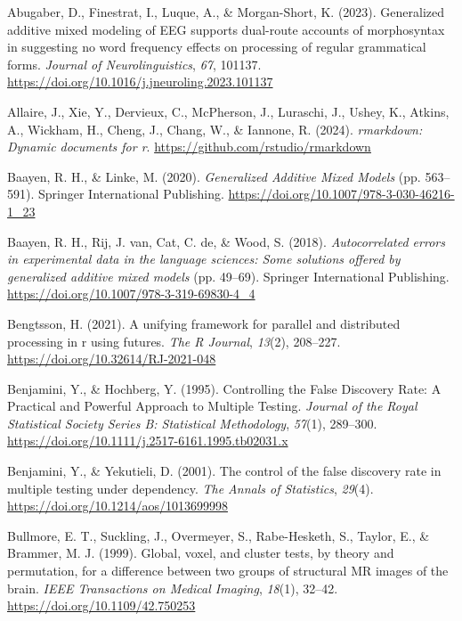 \documentclass[
  doc,
  floatsintext,
  longtable,
  a4paper,
  nolmodern,
  notxfonts,
  notimes,
  colorlinks=true,linkcolor=blue,citecolor=blue,urlcolor=blue]{apa7}
\newlength{\cslhangindent}
\newenvironment{CSLReferences}[2] %
 {\begin{list}{}{%
  \setlength{\itemindent}{0pt}
  \setlength{\leftmargin}{0pt}
  \setlength{\parsep}{0pt}
  \ifodd #1
   \setlength{\leftmargin}{\cslhangindent}
   \setlength{\itemindent}{-1\cslhangindent}
  \fi
  \setlength{\itemsep}{#2\baselineskip}}}
 {\end{list}}
\begin{document}
\label{refs}
\begin{CSLReferences}{1}{0}
Abugaber, D., Finestrat, I., Luque, A., \& Morgan-Short, K. (2023).
Generalized additive mixed modeling of EEG supports dual-route accounts
of morphosyntax in suggesting no word frequency effects on processing of
regular grammatical forms. \emph{Journal of Neurolinguistics},
\emph{67}, 101137.
\url{https://doi.org/10.1016/j.jneuroling.2023.101137}

Allaire, J., Xie, Y., Dervieux, C., McPherson, J., Luraschi, J., Ushey,
K., Atkins, A., Wickham, H., Cheng, J., Chang, W., \& Iannone, R.
(2024). \emph{{rmarkdown}: Dynamic documents for r}.
\url{https://github.com/rstudio/rmarkdown}

Baayen, R. H., \& Linke, M. (2020). \emph{Generalized Additive Mixed
Models} (pp. 563--591). Springer International Publishing.
\url{https://doi.org/10.1007/978-3-030-46216-1_23}

Baayen, R. H., Rij, J. van, Cat, C. de, \& Wood, S. (2018).
\emph{Autocorrelated errors in experimental data in the language
sciences: Some solutions offered by generalized additive mixed models}
(pp. 49--69). Springer International Publishing.
\url{https://doi.org/10.1007/978-3-319-69830-4_4}

Bengtsson, H. (2021). A unifying framework for parallel and distributed
processing in r using futures. \emph{The R Journal}, \emph{13}(2),
208--227. \url{https://doi.org/10.32614/RJ-2021-048}

Benjamini, Y., \& Hochberg, Y. (1995). Controlling the False Discovery
Rate: A Practical and Powerful Approach to Multiple Testing.
\emph{Journal of the Royal Statistical Society Series B: Statistical
Methodology}, \emph{57}(1), 289--300.
\url{https://doi.org/10.1111/j.2517-6161.1995.tb02031.x}

Benjamini, Y., \& Yekutieli, D. (2001). The control of the false
discovery rate in multiple testing under dependency. \emph{The Annals of
Statistics}, \emph{29}(4). \url{https://doi.org/10.1214/aos/1013699998}

Bullmore, E. T., Suckling, J., Overmeyer, S., Rabe-Hesketh, S., Taylor,
E., \& Brammer, M. J. (1999). Global, voxel, and cluster tests, by
theory and permutation, for a difference between two groups of
structural MR images of the brain. \emph{IEEE Transactions on Medical
Imaging}, \emph{18}(1), 32--42. \url{https://doi.org/10.1109/42.750253}


\end{CSLReferences}
\end{document}
